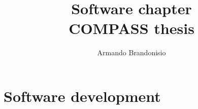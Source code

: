 \documentclass[10pt,a4paper, openany]{book}
\author{Armando Brandonisio}
\title{\textbf{Software chapter}\\COMPASS thesis}
\begin{document}
\maketitle
\tableofcontents \newpage

\chapter{Software development}
\end{document}
